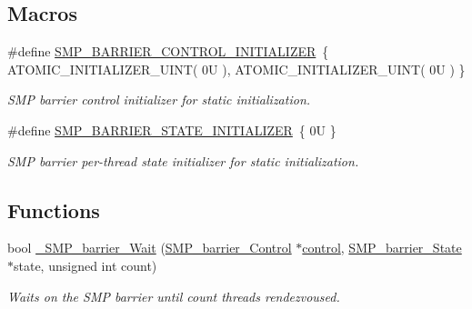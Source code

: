 \subsection*{Macros}
\begin{DoxyCompactItemize}
\item 
\mbox{\label{group__RTEMSScoreSMPBarrier_gaf39e68ef5020db42cd1556e97147a1ce}} 
\#define \mbox{\hyperlink{group__RTEMSScoreSMPBarrier_gaf39e68ef5020db42cd1556e97147a1ce}{S\+M\+P\+\_\+\+B\+A\+R\+R\+I\+E\+R\+\_\+\+C\+O\+N\+T\+R\+O\+L\+\_\+\+I\+N\+I\+T\+I\+A\+L\+I\+Z\+ER}}~\{ A\+T\+O\+M\+I\+C\+\_\+\+I\+N\+I\+T\+I\+A\+L\+I\+Z\+E\+R\+\_\+\+U\+I\+NT( 0\+U ), A\+T\+O\+M\+I\+C\+\_\+\+I\+N\+I\+T\+I\+A\+L\+I\+Z\+E\+R\+\_\+\+U\+I\+N\+T( 0\+U ) \}
\begin{DoxyCompactList}\small\item\em S\+MP barrier control initializer for static initialization. \end{DoxyCompactList}\item 
\mbox{\label{group__RTEMSScoreSMPBarrier_gafea025be33ce25ee0a6343956087604f}} 
\#define \mbox{\hyperlink{group__RTEMSScoreSMPBarrier_gafea025be33ce25ee0a6343956087604f}{S\+M\+P\+\_\+\+B\+A\+R\+R\+I\+E\+R\+\_\+\+S\+T\+A\+T\+E\+\_\+\+I\+N\+I\+T\+I\+A\+L\+I\+Z\+ER}}~\{ 0\+U \}
\begin{DoxyCompactList}\small\item\em S\+MP barrier per-\/thread state initializer for static initialization. \end{DoxyCompactList}\end{DoxyCompactItemize}
\subsection*{Functions}
\begin{DoxyCompactItemize}
\item 
bool \mbox{\hyperlink{group__RTEMSScoreSMPBarrier_ga329273596615cb2e6bdaaf6f5278d54f}{\+\_\+\+S\+M\+P\+\_\+barrier\+\_\+\+Wait}} (\mbox{\hyperlink{structSMP__barrier__Control}{S\+M\+P\+\_\+barrier\+\_\+\+Control}} $\ast$\mbox{\hyperlink{structcontrol}{control}}, \mbox{\hyperlink{structSMP__barrier__State}{S\+M\+P\+\_\+barrier\+\_\+\+State}} $\ast$state, unsigned int count)
\begin{DoxyCompactList}\small\item\em Waits on the S\+MP barrier until count threads rendezvoused. \end{DoxyCompactList}\end{DoxyCompactItemize}


